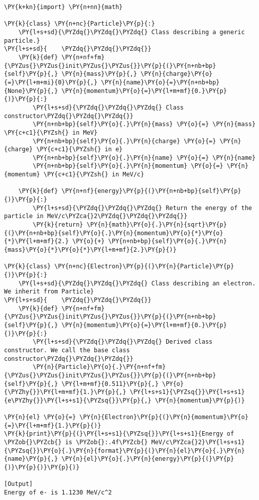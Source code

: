 \begin{Verbatim}[label=\makebox{\url{https://github.com/lucabaldini/cmepda/tree/master/slides/latex/snippets/inheritance.py}},commandchars=\\\{\}]
\PY{k+kn}{import} \PY{n+nn}{math}

\PY{k}{class} \PY{n+nc}{Particle}\PY{p}{:}
    \PY{l+s+sd}{\PYZdq{}\PYZdq{}\PYZdq{} Class describing a generic particle.}
\PY{l+s+sd}{    \PYZdq{}\PYZdq{}\PYZdq{}}
    \PY{k}{def} \PY{n+nf+fm}{\PYZus{}\PYZus{}init\PYZus{}\PYZus{}}\PY{p}{(}\PY{n+nb+bp}{self}\PY{p}{,} \PY{n}{mass}\PY{p}{,} \PY{n}{charge}\PY{o}{=}\PY{l+m+mi}{0}\PY{p}{,} \PY{n}{name}\PY{o}{=}\PY{n+nb+bp}{None}\PY{p}{,} \PY{n}{momentum}\PY{o}{=}\PY{l+m+mf}{0.}\PY{p}{)}\PY{p}{:}
        \PY{l+s+sd}{\PYZdq{}\PYZdq{}\PYZdq{} Class constructor\PYZdq{}\PYZdq{}\PYZdq{}}
        \PY{n+nb+bp}{self}\PY{o}{.}\PY{n}{mass} \PY{o}{=} \PY{n}{mass} \PY{c+c1}{\PYZsh{} in MeV}
        \PY{n+nb+bp}{self}\PY{o}{.}\PY{n}{charge} \PY{o}{=} \PY{n}{charge} \PY{c+c1}{\PYZsh{} in e}
        \PY{n+nb+bp}{self}\PY{o}{.}\PY{n}{name} \PY{o}{=} \PY{n}{name}
        \PY{n+nb+bp}{self}\PY{o}{.}\PY{n}{momentum} \PY{o}{=} \PY{n}{momentum} \PY{c+c1}{\PYZsh{} in MeV/c}
    
    \PY{k}{def} \PY{n+nf}{energy}\PY{p}{(}\PY{n+nb+bp}{self}\PY{p}{)}\PY{p}{:}
        \PY{l+s+sd}{\PYZdq{}\PYZdq{}\PYZdq{} Return the energy of the particle in MeV/c\PYZca{}2\PYZdq{}\PYZdq{}\PYZdq{}}
        \PY{k}{return} \PY{n}{math}\PY{o}{.}\PY{n}{sqrt}\PY{p}{(}\PY{n+nb+bp}{self}\PY{o}{.}\PY{n}{momentum}\PY{o}{*}\PY{o}{*}\PY{l+m+mf}{2.} \PY{o}{+} \PY{n+nb+bp}{self}\PY{o}{.}\PY{n}{mass}\PY{o}{*}\PY{o}{*}\PY{l+m+mf}{2.}\PY{p}{)}
 
\PY{k}{class} \PY{n+nc}{Electron}\PY{p}{(}\PY{n}{Particle}\PY{p}{)}\PY{p}{:}
    \PY{l+s+sd}{\PYZdq{}\PYZdq{}\PYZdq{} Class describing an electron. We inherit from Particle}
\PY{l+s+sd}{    \PYZdq{}\PYZdq{}\PYZdq{}}
    \PY{k}{def} \PY{n+nf+fm}{\PYZus{}\PYZus{}init\PYZus{}\PYZus{}}\PY{p}{(}\PY{n+nb+bp}{self}\PY{p}{,} \PY{n}{momentum}\PY{o}{=}\PY{l+m+mf}{0.}\PY{p}{)}\PY{p}{:}
        \PY{l+s+sd}{\PYZdq{}\PYZdq{}\PYZdq{} Derived class constructor. We call the base class constructor\PYZdq{}\PYZdq{}\PYZdq{}}
        \PY{n}{Particle}\PY{o}{.}\PY{n+nf+fm}{\PYZus{}\PYZus{}init\PYZus{}\PYZus{}}\PY{p}{(}\PY{n+nb+bp}{self}\PY{p}{,} \PY{l+m+mf}{0.511}\PY{p}{,} \PY{o}{\PYZhy{}}\PY{l+m+mf}{1.}\PY{p}{,} \PY{l+s+s1}{\PYZsq{}}\PY{l+s+s1}{e\PYZhy{}}\PY{l+s+s1}{\PYZsq{}}\PY{p}{,} \PY{n}{momentum}\PY{p}{)}
        
\PY{n}{el} \PY{o}{=} \PY{n}{Electron}\PY{p}{(}\PY{n}{momentum}\PY{o}{=}\PY{l+m+mf}{1.}\PY{p}{)}
\PY{k}{print}\PY{p}{(}\PY{l+s+s1}{\PYZsq{}}\PY{l+s+s1}{Energy of \PYZob{}\PYZcb{} is \PYZob{}:.4f\PYZcb{} MeV/c\PYZca{}2}\PY{l+s+s1}{\PYZsq{}}\PY{o}{.}\PY{n}{format}\PY{p}{(}\PY{n}{el}\PY{o}{.}\PY{n}{name}\PY{p}{,} \PY{n}{el}\PY{o}{.}\PY{n}{energy}\PY{p}{(}\PY{p}{)}\PY{p}{)}\PY{p}{)}

[Output]
Energy of e- is 1.1230 MeV/c^2
\end{Verbatim}